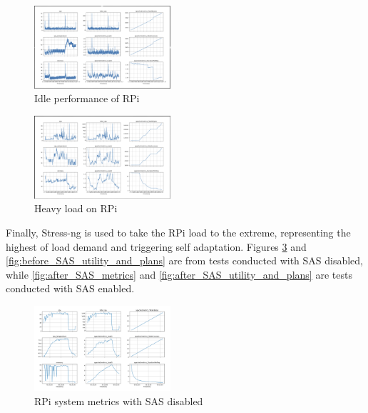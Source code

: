 \documentclass[conference]{IEEEtran}
\begin{document}
\begin{figure}[H]
    \centering
    \includegraphics[width=0.45\textwidth]{./media/idle_graphs.png}
    \caption{Idle performance of RPi}
    \label{fig:idle_graphs}
\end{figure}

\begin{figure}[H]
    \centering
    \includegraphics[width=0.45\textwidth]{./media/heavy_load.png}
    \caption{Heavy load on RPi}
    \label{fig:heavy_load}
\end{figure}

Finally, Stress-ng is used to take the RPi load to the extreme, representing the highest of load demand and triggering self adaptation. Figures \ref{fig:before_SAS_metrics} and \ref{fig:before_SAS_utility_and_plans} are from tests conducted with SAS disabled, while \ref{fig:after_SAS_metrics} and \ref{fig:after_SAS_utility_and_plans} are tests conducted with SAS enabled.

\begin{figure}[H]
    \centering
    \includegraphics[width=0.45\textwidth]{./media/before_SAS_metrics.png}
    \caption{RPi system metrics with SAS disabled}
    \label{fig:before_SAS_metrics}
\end{figure}
\end{document}
